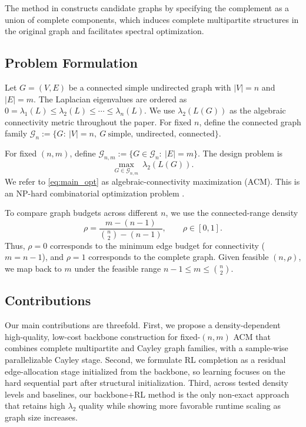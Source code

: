 \documentclass[letterpaper, 10 pt, conference]{ieeeconf}  %
\newcommand{\1}{\mathbf{1}}
\newcommand{\0}{\mathbf{0}}
\begin{document}
The method in \cite{Shahbaz23} constructs candidate graphs by specifying the complement as a union of complete components, which induces complete multipartite structures in the original graph and facilitates spectral optimization.

\subsection{Problem Formulation}
Let \(G=(V,E)\) be a connected simple undirected graph with \(|V|=n\) and \(|E|=m\).
The Laplacian eigenvalues are ordered as \(0=\lambda_1(L)\le \lambda_2(L)\le \cdots\le \lambda_n(L)\).
We use \(\lambda_2(L(G))\) as the algebraic connectivity metric throughout the paper.
For fixed \(n\), define the connected graph family \(\mathcal G_n:=\{G:\ |V|=n,\ G\ \text{simple, undirected, connected}\}\).

For fixed \((n,m)\), define \(\mathcal G_{n,m}:=\{G\in\mathcal G_n:\ |E|=m\}\).
The design problem is
\begin{equation}
\max_{G\in\mathcal G_{n,m}}\ \lambda_2(L(G)).
\label{eq:main_opt}
\end{equation}
We refer to \eqref{eq:main_opt} as algebraic-connectivity maximization (ACM).
This is an NP-hard combinatorial optimization problem \cite{MOSKAOYAMA2008677}.

To compare graph budgets across different \(n\), we use the connected-range density
\begin{equation}
\rho
=
\frac{m-(n-1)}{\binom{n}{2}-(n-1)},
\qquad
\rho\in[0,1].
\label{eq:rho_connected}
\end{equation}
Thus, \(\rho=0\) corresponds to the minimum edge budget for connectivity (\(m=n-1\)), and \(\rho=1\) corresponds to the complete graph.
Given feasible \((n,\rho)\), we map back to \(m\) under the feasible range \(n-1\le m\le \binom n2\).



\subsection{Contributions}
Our main contributions are threefold.
First, we propose a density-dependent high-quality, low-cost backbone construction for fixed-\((n,m)\) ACM that combines complete multipartite and Cayley graph families, with a sample-wise parallelizable Cayley stage.
Second, we formulate RL completion as a residual edge-allocation stage initialized from the backbone, so learning focuses on the hard sequential part after structural initialization.
Third, across tested density levels and baselines, our backbone+RL method is the only non-exact approach that retains high \(\lambda_2\) quality while showing more favorable runtime scaling as graph size increases.
\end{document}
